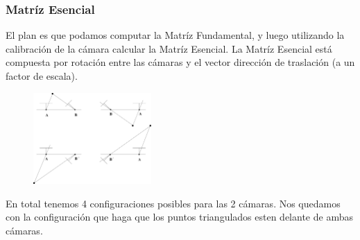 \begin{frame}
    \frametitle{Matríz Esencial}


    El plan es que podamos computar la Matríz Fundamental, y luego utilizando la calibración de la cámara calcular la Matríz Esencial. La Matríz Esencial está compuesta por rotación entre las cámaras y el vector dirección de traslación (a un factor de escala).
    
    \begin{figure}
        \includegraphics[width=0.4\textwidth]{./images/essential_matrix_possible_solutions.pdf}
    \end{figure}

    En total tenemos 4 configuraciones posibles para las 2 cámaras. Nos quedamos con la configuración que haga que los puntos triangulados esten delante de ambas cámaras.
\end{frame}


